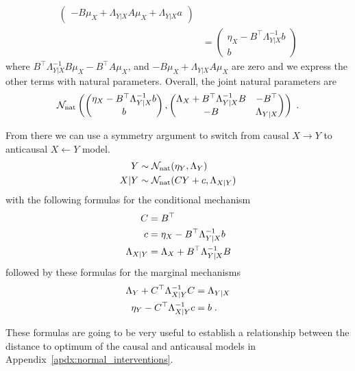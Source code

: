 \begin{subappendices}
\begin{align*}
\begin{pmatrix}
    -B \mu_X + \Lambda_{Y|X} A \mu_X + \Lambda_{Y|X} a
    \end{pmatrix} \\
    &=\begin{pmatrix}
    \eta_X - B^\top\Lambda_{Y|X}^{-1}b \\b
    \end{pmatrix}
\end{align*}
where $B^\top \Lambda_{Y|X}^{-1}B\mu_X - B^\top A \mu_X$, and $ -B \mu_X + \Lambda_{Y|X} A \mu_X $ are zero and we express the other terms with natural parameters.
Overall, the joint natural parameters are
\begin{align*}
    {\mathcal N}_\text{nat} \left (
    \begin{pmatrix}
    \eta_X - B^\top\Lambda_{Y|X}^{-1}b \\
    b
    \end{pmatrix},
    \begin{pmatrix}
    \Lambda_X + B^\top \Lambda_{Y|X}^{-1}B & -B^\top \\
    -B & \Lambda_{Y|X}
    \end{pmatrix}
    \right ) \; .
\end{align*}

From there we can use a symmetry argument to switch from causal $X \rightarrow Y$ to anticausal $X \leftarrow Y$ model.
\begin{align*}
    Y & \sim {\mathcal N}_\text{nat}(\eta_Y, \Lambda_Y) \\
    X|Y & \sim {\mathcal N}_\text{nat}(C Y + c, \Lambda_{X|Y})
\end{align*}
with the following formulas for the conditional mechanism
\begin{align}
    C &= B^\top \\
    c &= \eta_X - B^\top\Lambda_{Y|X}^{-1}b \\
    \Lambda_{X|Y} &=\Lambda_X + B^\top\Lambda_{Y|X}^{-1} B
    \label{eq:normal_switch_conditional}
\end{align}
followed by these formulas for the marginal mechanisms
\begin{align}
    \Lambda_Y + C^\top\Lambda_{X|Y}^{-1} C &= \Lambda_{Y|X} \\
    \eta_Y - C^\top \Lambda_{X|Y}^{-1} c &= b \; .
\end{align}

These formulas are going to be very useful to establish a relationship between the distance to optimum of the causal and anticausal models in Appendix~\ref{apdx:normal_interventions}.


\end{subappendices}
